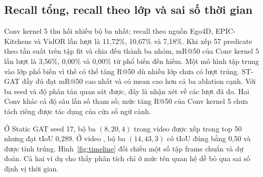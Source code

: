 \subsection{Recall tổng, recall theo lớp và sai số thời gian}
Conv kernel 5 thu hồi nhiều bộ ba nhất; recall theo nguồn Ego4D,
EPIC-Kitchens và VidOR lần lượt là 11,72\%, 10,67\% và 7,18\%. Khi xếp 57
predicate theo tần suất trên tập fit và chia đều thành ba nhóm, mR@50 của
Conv kernel 5 lần lượt là 3,56\%, 0,00\% và 0,00\% từ phổ biến đến hiếm.
Một mô hình tập trung vào lớp phổ biến vì thế có thể tăng R@50 dù nhiều lớp
chưa có lượt trúng. ST-GAT đầy đủ đạt mR@50 cao nhất và có mean cao hơn cả
ba ablation cạnh. Với ba seed và độ phân tán quan sát được, đây là nhận xét
về các lượt đã đo. Hai Conv khác cả độ sâu lẫn số tham số; mức tăng R@50
của Conv kernel 5 chưa tách riêng được tác dụng của cửa sổ ngữ cảnh.

Ở Static GAT seed 17, bộ ba $(8,20,4)$ trong video 
được xếp trong top 50 nhưng đạt tIoU 0,289. Ở video
, bộ ba $(14,43,3)$ có tIoU đúng bằng 0,50 và được
tính trúng. Hình~\ref{fig:timeline} đối chiếu một số tập frame chuẩn và dự
đoán. Cả hai ví dụ cho thấy phân tích chỉ ở mức tên quan hệ dễ bỏ qua sai số
định vị thời gian.
